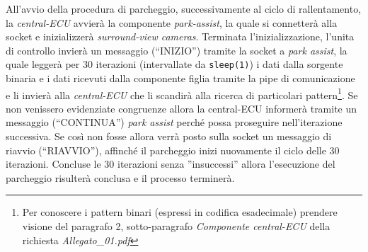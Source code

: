 \documentclass[11pt, openany]{article}
\theoremstyle{definition}
\theoremstyle{plain}
\theoremstyle{remark}
\begin{document}
			All'avvio della procedura di parcheggio, successivamente al ciclo di rallentamento, la \textit{central-ECU} avvierà la componente \textit{park-assist}, la quale si connetterà alla socket e inizializzerà \textit{surround-view cameras}. Terminata l'inizializzazione, l'unita di controllo invierà un messaggio (``INIZIO'') tramite la socket a \textit{park assist}, la quale leggerà per 30 iterazioni (intervallate da \texttt{sleep(1)}) i dati dalla sorgente binaria e i dati ricevuti dalla componente figlia tramite la pipe di comunicazione e li invierà alla \textit{central-ECU} che li scandirà alla ricerca di particolari pattern\footnote{Per conoscere i pattern binari (espressi in codifica esadecimale) prendere visione del paragrafo 2, sotto-paragrafo \textit{Componente central-ECU} della richiesta \textit{Allegato\_01.pdf}}. Se non venissero evidenziate congruenze allora la central-ECU informerà tramite un messaggio (``CONTINUA'') \textit{park assist} perché possa proseguire nell'iterazione successiva. Se così non fosse allora verrà posto sulla socket un messaggio di riavvio (``RIAVVIO''), affinché il parcheggio inizi nuovamente il ciclo delle 30 iterazioni. Concluse le 30 iterazioni senza ''insuccessi'' allora l'esecuzione del parcheggio risulterà conclusa e il processo terminerà.
\end{document}
